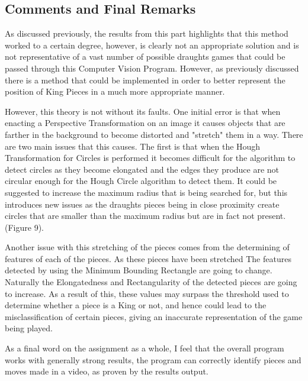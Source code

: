 \documentclass[11pt]{article}
\begin{document}
    \subsection{Comments and Final Remarks}
    As discussed previously, the results from this part highlights that this method worked to a certain degree, however, is clearly not an appropriate solution and is not representative of a vast number of possible draughts games that could be passed through this Computer Vision Program. However, as previously discussed there is a method that could be implemented in order to better 
    represent the position of King Pieces in a much more appropriate manner.
    \par
    However, this theory is not without its faults. One initial error is that when enacting a Perspective Transformation on an image it causes objects that are farther in the background to become distorted and "stretch" them in a way. There are two main issues that this causes. The first is that when the Hough Transformation for Circles is performed it becomes difficult for the algorithm
    to detect circles as they become elongated and the edges they produce are not circular enough for the Hough Circle algorithm to detect them. It could be suggested to increase the maximum radius that is being searched for, but this introduces new issues as the draughts pieces being in close proximity create circles that are smaller than the maximum radius but are in fact not present.
    (Figure 9).
    \par
    Another issue with this stretching of the pieces comes from the determining of features of each of the pieces. As these pieces have been stretched The features detected by using the Minimum Bounding Rectangle are going to change. Naturally the Elongatedness and Rectangularity of the detected pieces are going to increase. As a result of this, these values may surpass the threshold used to 
    determine whether a piece is a King or not, and hence could lead to the misclassification of certain pieces, giving an inaccurate representation of the game being played.
    \par
    As a final word on the assignment as a whole, I feel that the overall program works with generally strong results, the program can correctly identify pieces and moves made in a video, as proven by the results output.  

    
    
\end{document}
